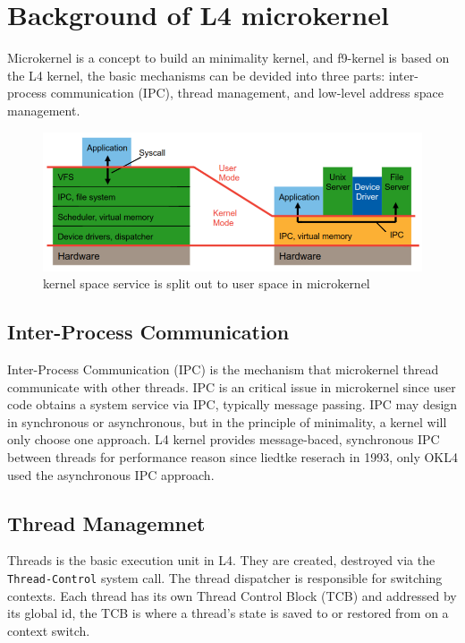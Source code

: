 \documentclass[10pt,preprint,nocopyrightspace]{sigplanconf}
\begin{document}
\section{Background of L4 microkernel}

Microkernel is a concept to build an minimality kernel, and f9-kernel is based on the L4 kernel, the basic mechanisms can be devided into three parts: inter-process communication (IPC), thread management, and low-level address space management.

\begin{figure}[H]
	\begin{center}
		\includegraphics[width=\linewidth]{picture/kernel_diff.png}
	\end{center}
	\caption{kernel space service is split out to user space in microkernel \cite{heiser2012}}
	\label{fig:kernel_diff}
\end{figure}


\subsection{Inter-Process Communication}

Inter-Process Communication (IPC) is the mechanism that microkernel thread communicate with other threads\cite{liedtke1993improving}. IPC is an critical issue in microkernel since user code obtains a system service via IPC, typically message passing. IPC may design in synchronous or asynchronous, but in the principle of minimality, a kernel will only choose one approach. L4 kernel provides message-baced, synchronous IPC between threads for performance reason since liedtke reserach in 1993\cite{liedtke1993improving}, only OKL4 used the asynchronous IPC approach\cite{elphinstone2013l3}.

\subsection{Thread Managemnet}

Threads is the basic execution unit in L4. They are created, destroyed via the \verb|Thread-Control| system call\cite{nourai2005aphysically}. The thread dispatcher is responsible for switching contexts. Each thread has its own Thread Control Block (TCB) and addressed by its global id, the TCB is where a thread's state is saved to or restored from on a context switch\cite{nourai2005aphysically}.
\end{document}
